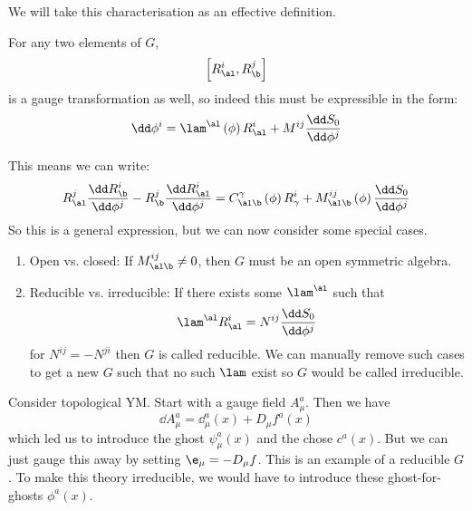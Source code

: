 \documentclass{booc}
\begin{document}
We will take this characterisation as an effective definition.

\begin{prop}
For any two elements of $G$, 
\begin{equation}
\left[ R_\al^i , R_\b^j \right]
\end{equation}
is a gauge transformation as well, so indeed this must be expressible in the form:
\begin{equation}
\dd \phi^i = \lam^\al\left( \phi \right)R^i_\al
+ M^{ij} \frac{\dd S_0}{\dd \phi^j}
\end{equation}
\end{prop}

This means we can write:
\begin{equation}
R^j_\al \frac{\dd R^i_\b}{\dd \phi^j} - 
R^j_\b \frac{\dd R^i_\al}{\dd \phi^j} = 
C^\gamma_{\al\b}\left( \phi \right)R^i_\gamma + M^{ij}_{\al\b}\left( \phi \right)
\frac{\dd S_0}{\dd \phi^j}
\end{equation}
So this is a general expression, but we can now consider some special cases.

\begin{enumerate}
\item Open vs. closed: If $M^{ij}_{\al\b} \neq 0$, then $G$ must be an open symmetric algebra.

\item Reducible vs. irreducible: If there exists some $\lam^\al$ such that
\begin{equation}
\lam^\al R^i_\al = N^{ij} \frac{\dd S_0}{\dd \phi^j}
\end{equation}
for $N^{ij} = -N^{ji}$ then $G$ is called reducible.
We can manually remove such cases to get a new $G$ such that no such $\lam$ exist so $G$ would
be called irreducible. 
\end{enumerate}

\begin{exm}
Consider topological YM. Start with a gauge field $A_\mu^a$. 
Then we have
\begin{equation}
\dd A_\mu^a = \dd_\mu^a\left( x \right) + 
D_\mu f^a\left( x \right)
\end{equation}
which led us to introduce the ghost $\psi_\mu^a\left( x \right)$
and the chose $c^a\left( x \right)$. But we can just gauge this away by setting
$\e_\mu = -D_\mu f$. This is an example of a reducible $G$.
To make this theory irreducible, we would have to introduce these ghost-for-ghosts 
$\phi^a\left( x \right)$.
\end{exm}
\end{document}

